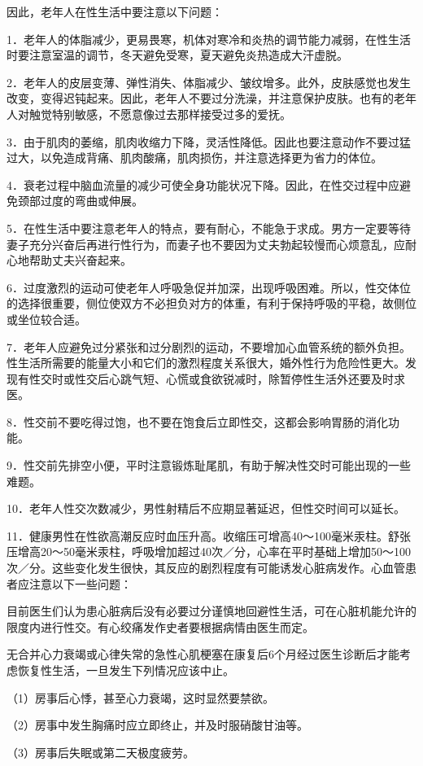 \documentclass[12pt,UTF8,openany]{ctexbook}
\begin{document}
因此，老年人在性生活中要注意以下问题：

1．老年人的体脂减少，更易畏寒，机体对寒冷和炎热的调节能力减弱，在性生活时要注意室温的调节，冬天避免受寒，夏天避免炎热造成大汗虚脱。

2．老年人的皮层变薄、弹性消失、体脂减少、皱纹增多。此外，皮肤感觉也发生改变，变得迟钝起来。因此，老年人不要过分洗澡，并注意保护皮肤。也有的老年人对触觉特别敏感，不愿意像过去那样接受过多的爱抚。

3．由于肌肉的萎缩，肌肉收缩力下降，灵活性降低。因此也要注意动作不要过猛过大，以免造成背痛、肌肉酸痛，肌肉损伤，并注意选择更为省力的体位。

4．衰老过程中脑血流量的减少可使全身功能状况下降。因此，在性交过程中应避免颈部过度的弯曲或伸展。

5．在性生活中要注意老年人的特点，要有耐心，不能急于求成。男方一定要等待妻子充分兴奋后再进行性行为，而妻子也不要因为丈夫勃起较慢而心烦意乱，应耐心地帮助丈夫兴奋起来。

6．过度激烈的运动可使老年人呼吸急促并加深，出现呼吸困难。所以，性交体位的选择很重要，侧位使双方不必担负对方的体重，有利于保持呼吸的平稳，故侧位或坐位较合适。

7．老年人应避免过分紧张和过分剧烈的运动，不要增加心血管系统的额外负担。性生活所需要的能量大小和它们的激烈程度关系很大，婚外性行为危险性更大。发现有性交时或性交后心跳气短、心慌或食欲锐减时，除暂停性生活外还要及时求医。

8．性交前不要吃得过饱，也不要在饱食后立即性交，这都会影响胃肠的消化功能。

9．性交前先排空小便，平时注意锻炼耻尾肌，有助于解决性交时可能出现的一些难题。

10．老年人性交次数减少，男性射精后不应期显著延迟，但性交时间可以延长。

11．健康男性在性欲高潮反应时血压升高。收缩压可增高40～100毫米汞柱。舒张压增高20～50毫米汞柱，呼吸增加超过40次／分，心率在平时基础上增加50～100次／分。这些变化发生很快，其反应的剧烈程度有可能诱发心脏病发作。心血管患者应注意以下一些问题：

目前医生们认为患心脏病后没有必要过分谨慎地回避性生活，可在心脏机能允许的限度内进行性交。有心绞痛发作史者要根据病情由医生而定。

无合并心力衰竭或心律失常的急性心肌梗塞在康复后6个月经过医生诊断后才能考虑恢复性生活，一旦发生下列情况应该中止。

（1）房事后心悸，甚至心力衰竭，这时显然要禁欲。

（2）房事中发生胸痛时应立即终止，并及时服硝酸甘油等。

（3）房事后失眠或第二天极度疲劳。
\end{document}
